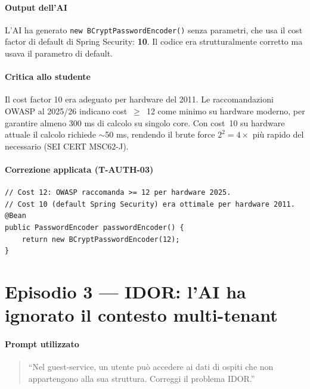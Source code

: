 ﻿\documentclass[a4paper,12pt]{report}
\begin{document}
\paragraph{Output dell'AI}
L'AI ha generato \texttt{new BCryptPasswordEncoder()} senza parametri, che usa
il cost factor di default di Spring Security: \textbf{10}.
Il codice era strutturalmente corretto ma usava il parametro di default.

\paragraph{Critica allo studente}
Il cost factor 10 era adeguato per hardware del 2011. Le raccomandazioni OWASP
al 2025/26 indicano cost~$\geq$~12 come minimo su hardware moderno, per garantire
almeno 300 ms di calcolo su singolo core. Con cost~10 su hardware attuale il
calcolo richiede $\sim$50 ms, rendendo il brute force $2^2 = 4\times$ più rapido
del necessario (SEI CERT MSC62-J).

\paragraph{Correzione applicata (T-AUTH-03)}

\begin{securebox}[title={BCrypt cost 12 esplicito (T-AUTH-03, SEI CERT MSC62-J)}]
\begin{lstlisting}[style=java]
// Cost 12: OWASP raccomanda >= 12 per hardware 2025.
// Cost 10 (default Spring Security) era ottimale per hardware 2011.
@Bean
public PasswordEncoder passwordEncoder() {
    return new BCryptPasswordEncoder(12);
}
\end{lstlisting}
\end{securebox}

\section{Episodio 3 --- IDOR: l'AI ha ignorato il contesto multi-tenant}

\paragraph{Prompt utilizzato}
\begin{quote}
``Nel guest-service, un utente può accedere ai dati di ospiti che non appartengono
alla sua struttura. Correggi il problema IDOR.''
\end{quote}
\end{document}
